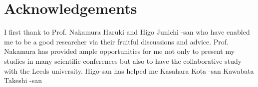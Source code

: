 \chapter*{Acknowledgements}
I first thank to Prof. Nakamura Haruki and Higo Junichi -san who have enabled me to be a good researcher via their fruitful discussions and advice. 
Prof. Nakamura has provided ample opportunities for me not only to present my studies in many scientific conferences but also to have the collaborative study with the Leeds university. 
Higo-san has helped me
Kasahara Kota -san
Kawabata Takeshi -san